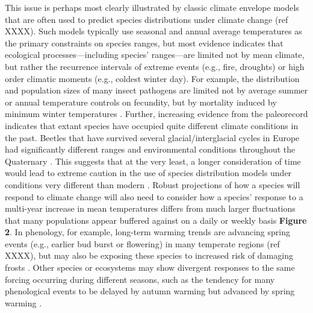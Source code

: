 \documentclass[11pt,a4paper,oneside]{article}
\begin{document}
This issue is perhaps most clearly illustrated by classic climate envelope models that are often used to predict species distributions under climate change (ref XXXX). Such models typically use seasonal and annual average temperatures as the primary constraints on species ranges, but most evidence indicates that ecological processes---including species' ranges---are limited not by mean climate, but rather the recurrence intervals of extreme events (e.g., fire, droughts) or high order climatic moments (e.g., coldest winter day). For example, the distribution and population sizes of many insect pathogens are limited not by average summer or annual temperature controls on fecundity, but by mortality induced by minimum winter temperatures \citep{weed2013}. Further, increasing evidence from the paleorecord indicates that extant species have occupied quite different climate conditions in the past. Beetles that have survived several glacial/interglacial cycles in Europe had significantly different ranges and environmental conditions throughout the Quaternary \citep{Abellan2011}. This suggests that at the very least, a longer consideration of time would lead to extreme caution in the use of species distribution models under conditions very different than modern \citep[e.g.,][]{Williams:2007kx}. Robust projections of how a species will respond to climate change will also need to consider how a species' response to a multi-year increase in mean temperatures differs from much larger fluctuations that many populations appear buffered against on a daily or weekly basis {\bf Figure 2}. In phenology, for example, long-term warming trends are advancing spring events (e.g., earlier bud burst or flowering) in many temperate regions (ref XXXX), but may also be exposing these species to increased risk of damaging frosts \citep[e.g.,][]{Augspurger:2009gj}. Other species or ecosystems may show divergent responses to the same forcing occurring during different seasons, such as the tendency for many phenological events to be delayed by autumn warming but advanced by spring warming \citep[see][]{yu2010,Cook:2012pnas}. \\ 
\end{document}

